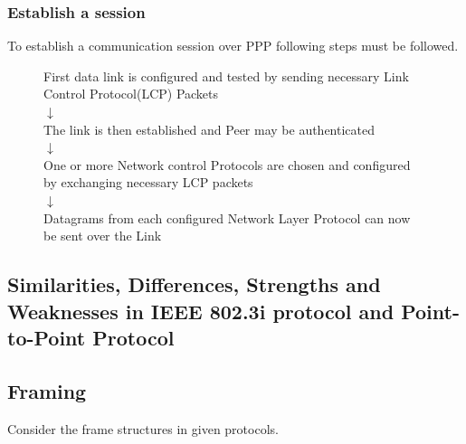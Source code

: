 \documentclass[a4paper,11pt]{article}%
\begin{document}
\subsubsection{Establish a session}

To establish a communication session over PPP following steps must be followed.
\begin{figure}[!h]
	\centering
{\footnotesize	First data link is configured and tested by sending necessary Link Control Protocol(LCP) Packets\\
	$\downarrow$\\
	The link is then established and Peer may be authenticated\\
	$\downarrow$\\
	One or more Network control Protocols are chosen and configured by exchanging necessary LCP packets\\
	$\downarrow$\\
	Datagrams from each configured Network Layer Protocol can now be sent over the Link}
\end{figure}

















\pagebreak
\begin{center}
	\section{Similarities, Differences, Strengths and Weaknesses in IEEE 802.3i protocol and Point-to-Point Protocol }
\end{center}


\subsection{Framing}

Consider the frame structures in given protocols.
 
\end{document}
